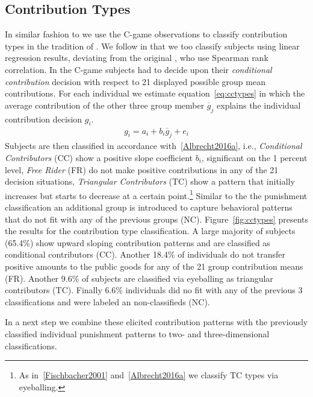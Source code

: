 \documentclass[11pt,a4paper]{article}
\newcommand{\FA}[1]{\todo[inline, color=green!40,author=Felix]{#1}}          %
\begin{document}
\begin{refsection}
\subsection{Contribution Types}
  
 In similar fashion to
\cite{Albrecht2016a} we use the C-game observations to classify contribution
types in the tradition of \cite{Fischbacher2001}.
We follow \cite{Albrecht2016a} in that we too classify subjects using linear
regression results, deviating from the original \cite{Fischbacher2001}, who use Spearman rank correlation.
In the C-game subjects had to decide upon their \emph{conditional contribution}
decision with respect to 21 displayed possible group mean contributions.
For each individual we estimate equation~\ref{eq:cctypes} in which the average
contribution of the other three group member $\overline{g}_{j}$ explains the
individual contribution decision $g_i$.
\begin{align}
  \label{eq:cctypes}
  g_i = a_i + b_i \overline{g}_{j} + e_i
\end{align}
Subjects are then classified in accordance with~\ref{Albrecht2016a}, i.e.,
\emph{Conditional Contributors} (CC) show a positive slope coefficient $b_i$,
significant on the 1 percent level, \emph{Free Rider} (FR) do not make positive
contributions in any of the 21 decision situations, \emph{Triangular
  Contributors} (TC) show a pattern that initially increases but starts to
decrease at a certain point.\footnote{As in~\ref{Fischbacher2001}
  and~\ref{Albrecht2016a} we classify TC types via eyeballing.} Similar to the the punishment classification an
additional group is introduced to capture behavioral patterns that do not fit
with any of the previous groups (NC).
Figure~\ref{fig:cctypes} presents the results for the contribution type classification.
A large majority of subjects (65.4\%) show upward sloping contribution patterns
and are classified as conditional contributors (CC). Another 18.4\% of individuals do
not transfer positive amounts to the public goods for any of the 21 group
contribution means (FR). Another 9.6\% of subjects are classified via eyeballing as triangular
contributors (TC). Finally 6.6\% individuals did no fit with any of the previous 3
classifications and were labeled an non-classifieds (NC). 

\FA{Usefull ?}
In a next step we combine these elicited contribution patterns with the previously
classified individual punishment patterns to two- and three-dimensional classifications.


\end{refsection}
\end{document}
